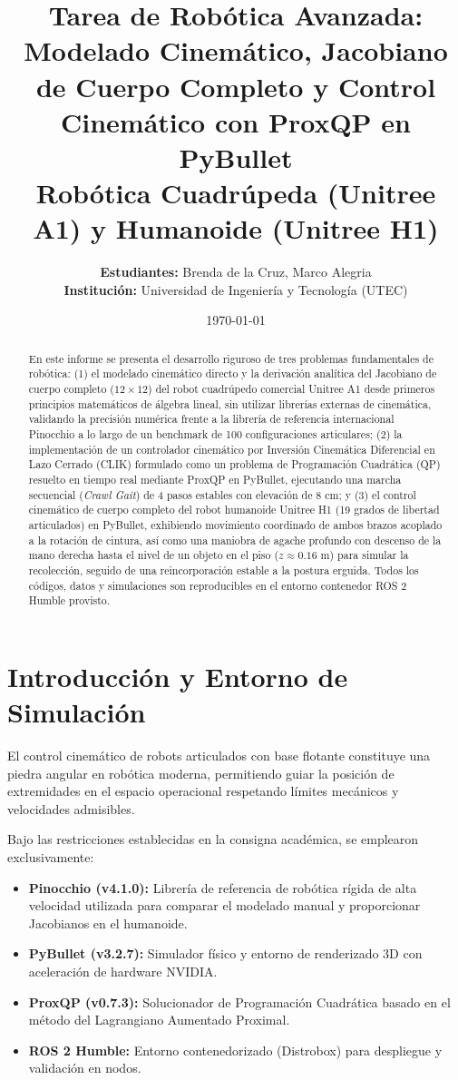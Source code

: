 \documentclass[11pt,a4paper]{article}
\title{\vspace{-1.5cm}\textbf{\Large Tarea de Robótica Avanzada:}\\[0.3cm]
\textbf{\huge Modelado Cinemático, Jacobiano de Cuerpo Completo y Control Cinemático con ProxQP en PyBullet}\\[0.5cm]
\large Robótica Cuadrúpeda (Unitree A1) y Humanoide (Unitree H1)}
\author{\textbf{Estudiantes:} Brenda de la Cruz, Marco Alegria \\
\textbf{Institución:} Universidad de Ingeniería y Tecnología (UTEC)}
\date{\today}
\begin{document}
\maketitle

\begin{abstract}
En este informe se presenta el desarrollo riguroso de tres problemas fundamentales de robótica: (1) el modelado cinemático directo y la derivación analítica del Jacobiano de cuerpo completo ($12 \times 12$) del robot cuadrúpedo comercial Unitree A1 desde primeros principios matemáticos de álgebra lineal, sin utilizar librerías externas de cinemática, validando la precisión numérica frente a la librería de referencia internacional Pinocchio a lo largo de un benchmark de 100 configuraciones articulares; (2) la implementación de un controlador cinemático por Inversión Cinemática Diferencial en Lazo Cerrado (CLIK) formulado como un problema de Programación Cuadrática (QP) resuelto en tiempo real mediante ProxQP en PyBullet, ejecutando una marcha secuencial (\textit{Crawl Gait}) de 4 pasos estables con elevación de 8 cm; y (3) el control cinemático de cuerpo completo del robot humanoide Unitree H1 (19 grados de libertad articulados) en PyBullet, exhibiendo movimiento coordinado de ambos brazos acoplado a la rotación de cintura, así como una maniobra de agache profundo con descenso de la mano derecha hasta el nivel de un objeto en el piso ($z \approx 0.16\text{ m}$) para simular la recolección, seguido de una reincorporación estable a la postura erguida. Todos los códigos, datos y simulaciones son reproducibles en el entorno contenedor ROS 2 Humble provisto.
\end{abstract}

\tableofcontents
\newpage

\section{Introducción y Entorno de Simulación}
El control cinemático de robots articulados con base flotante constituye una piedra angular en robótica moderna, permitiendo guiar la posición de extremidades en el espacio operacional respetando límites mecánicos y velocidades admisibles.

Bajo las restricciones establecidas en la consigna académica, se emplearon exclusivamente:
\begin{itemize}
    \item \textbf{Pinocchio (v4.1.0):} Librería de referencia de robótica rígida de alta velocidad utilizada para comparar el modelado manual y proporcionar Jacobianos en el humanoide.
    \item \textbf{PyBullet (v3.2.7):} Simulador físico y entorno de renderizado 3D con aceleración de hardware NVIDIA.
    \item \textbf{ProxQP (v0.7.3):} Solucionador de Programación Cuadrática basado en el método del Lagrangiano Aumentado Proximal.
    \item \textbf{ROS 2 Humble:} Entorno contenedorizado (Distrobox) para despliegue y validación en nodos.
\end{itemize}
\end{document}
